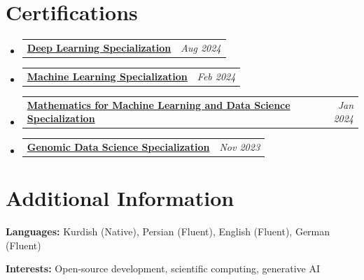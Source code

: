 \documentclass[a4paper,11pt]{article}
\makeatletter
\newcommand{\resumePOR}[3]{
\vspace{0.5mm}\item
    \begin{tabular*}{0.97\textwidth}[t]{l@{\extracolsep{\fill}}r}
        \textbf{#1}\hspace{0.3mm}#2 & \textit{\small{#3}} 
    \end{tabular*}
    \vspace{-2mm}
}
\newcommand{\resumeSubHeadingListStart}{\begin{itemize}[leftmargin=*,labelsep=1mm]}
\newcommand{\resumeSubHeadingListEnd}{\end{itemize}\vspace{2mm}}
\makeatother
\begin{document}
\section{\textbf{Certifications}}
\vspace{-0.2mm}
\resumeSubHeadingListStart
\resumePOR{}{\href{https://www.coursera.org/account/accomplishments/specialization/certificate/Y5P9ET2XZS5I}{\textbf{Deep Learning Specialization}}}{Aug 2024}
\resumePOR{}{\href{https://www.coursera.org/account/accomplishments/specialization/certificate/ZJGVGWJ4HVMX}{\textbf{Machine Learning Specialization}}}{Feb 2024}
\resumePOR{}{\href{https://www.coursera.org/account/accomplishments/specialization/certificate/TDRS2JEHG53W}{\textbf{Mathematics for Machine Learning and Data Science Specialization}}}{Jan 2024}
\resumePOR{}{\href{https://www.coursera.org/account/accomplishments/specialization/certificate/ZGPX9CM32BAR}{\textbf{Genomic Data Science Specialization}}}{Nov 2023}
\resumeSubHeadingListEnd

\vspace{-6mm}


\section{\textbf{Additional Information}}
\vspace{-0.4mm}
\small{
\textbf{Languages:} Kurdish (Native), Persian (Fluent), English (Fluent), German (Fluent)

\textbf{Interests:} Open-source development, scientific computing, generative AI}
\end{document}
